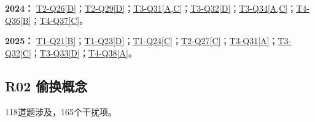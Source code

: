 \documentclass[11pt,a4paper]{article}
\begin{document}
\noindent\textbf{2024：} \hyperref[idx-2024-T2-Q26]{T2-Q26[D]}；\hyperref[idx-2024-T2-Q29]{T2-Q29[D]}；\hyperref[idx-2024-T3-Q31]{T3-Q31[A,C]}；\hyperref[idx-2024-T3-Q32]{T3-Q32[D]}；\hyperref[idx-2024-T3-Q34]{T3-Q34[A,C]}；\hyperref[idx-2024-T4-Q36]{T4-Q36[B]}；\hyperref[idx-2024-T4-Q37]{T4-Q37[C]}。\par\smallskip
\noindent\textbf{2025：} \hyperref[idx-2025-T1-Q21]{T1-Q21[B]}；\hyperref[idx-2025-T1-Q23]{T1-Q23[D]}；\hyperref[idx-2025-T1-Q24]{T1-Q24[C]}；\hyperref[idx-2025-T2-Q27]{T2-Q27[C]}；\hyperref[idx-2025-T3-Q31]{T3-Q31[A]}；\hyperref[idx-2025-T3-Q32]{T3-Q32[C]}；\hyperref[idx-2025-T3-Q33]{T3-Q33[D]}；\hyperref[idx-2025-T4-Q38]{T4-Q38[A]}。\par\smallskip
{}
\subsection{R02 偷换概念}\label{class-R02}
118道题涉及，165个干扰项。
\end{document}
